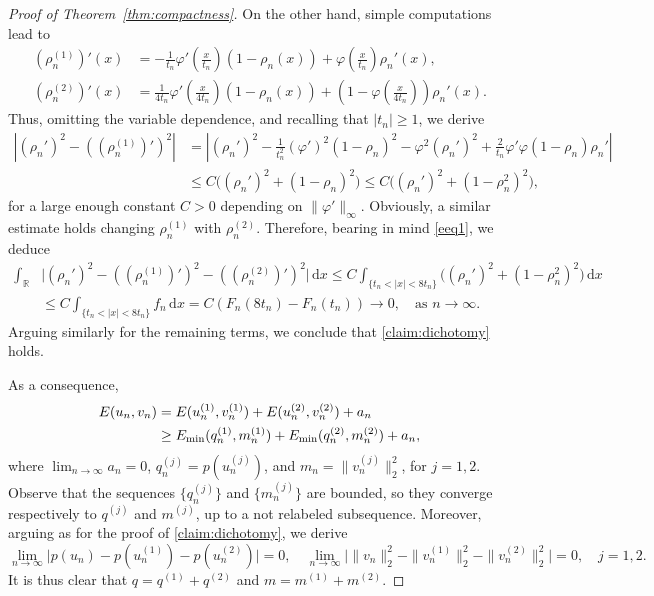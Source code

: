 \documentclass[11pt]{article}
\newcommand{\R}{\mathbb{R}}
\newcommand{\Emin}{E_\textup{min}}
\renewcommand{\d}{\,\mathrm{d}}
\theoremstyle{plain}
\theoremstyle{definition}
\theoremstyle{remark}
\numberwithin{equation}{section}
\begin{document}
{\begin{proof}[Proof of Theorem~\ref{thm:compactness}]
    On the other hand, simple computations lead to
    \begin{align*}
        (\rho_n^{(1)})'(x)&=-\frac{1}{t_n}\varphi'\left(\frac{x}{t_n}\right)(1-\rho_n(x))+\varphi\left(\frac{x}{t_n}\right)\rho_n'(x),
        \\(\rho_n^{(2)})'(x)&=\frac{1}{4t_n}\varphi'\left(\frac{x}{4t_n}\right)(1-\rho_n(x))+\left(1-\varphi\left(\frac{x}{4t_n}\right)\right)\rho_n'(x).
    \end{align*}
    Thus, omitting the variable dependence, and recalling that $|t_n|\geq 1$, we derive
    \begin{align*}
        |(\rho_n')^2-((\rho_n^{(1)})')^2|&=\left|(\rho_n')^2-\frac{1}{t_n^2}(\varphi')^2(1-\rho_n)^2-\varphi^2(\rho_n')^2+\frac{2}{t_n}\varphi'\varphi(1-\rho_n)\rho_n'\right|
    \\
    &\leq C\Big((\rho_n')^2+(1-\rho_n)^2\Big)\leq C\Big((\rho_n')^2+(1-\rho_n^2)^2\Big),
    \end{align*}
    for a large enough constant $C>0$ depending on $\|\varphi'\|_\infty$. Obviously, a similar estimate holds changing $\rho_n^{(1)}$ with $\rho_n^{(2)}$. Therefore, bearing in mind \eqref{eeq1}, we deduce
    \begin{align*}
        \int_\R&\Big|(\rho_n')^2-((\rho_n^{(1)})')^2-((\rho_n^{(2)})')^2\Big|\d x\leq C\int_{\{t_n<|x|<8t_n\}}\Big((\rho_n')^2+{(1-\rho_n^2)^2}\Big)\d x
        \\
        &\leq C\int_{\{t_n<|x|<8t_n\}} f_n \d x=C(F_n(8t_n)-F_n(t_n))\to 0,\quad\text{as }n\to\infty.
    \end{align*}
    Arguing similarly for the remaining terms, we conclude that \eqref{claim:dichotomy} holds.
    
    As a consequence,
    \begin{align}
        \nonumber E(u_n,v_n)&=E(u_n^{(1)},v_n^{(1)}) + E(u_n^{(2)},v_n^{(2)}) + a_n
        \\
        \label{ineqdichotomy}
        &\geq \Emin(q_n^{(1)},m_n^{(1)}) + \Emin(q_n^{(2)},m_n^{(2)}) + a_n,
    \end{align}
    where $\lim_{n\to\infty}a_n=0$, $q_n^{(j)}=p(u_n^{(j)})$, and $m_n=\|v_n^{(j)}\|_2^2$, for $j=1,2$. Observe that the sequences $\{q_n^{(j)}\}$ and $\{m_n^{(j)}\}$ are bounded, so they converge respectively to $q^{(j)}$ and $m^{(j)}$, up to a not relabeled subsequence. Moreover, arguing as for the proof of \eqref{claim:dichotomy}, we derive
    \[\lim_{n\to\infty}\Big|p(u_n)-p(u_n^{(1)})-p(u_n^{(2)})\Big|=0,\quad \lim_{n\to\infty}\Big|\|v_n\|_2^2-\|v_n^{(1)}\|_2^2-\|v_n^{(2)}\|_2^2\Big|=0,\quad j=1,2.\]
    It is thus clear that $q=q^{(1)}+q^{(2)}$ and $m=m^{(1)}+m^{(2)}$.
    

\end{proof}}
\end{document}
